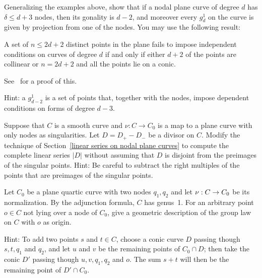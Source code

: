 \begin{exercise}
Generalizing the examples above, show that if a nodal plane curve of degree $d$ has $\delta\leq d+3$ nodes,
then its gonality is $d-2$, and moreover every $g^1_d$ on the curve is given by projection from one of the nodes.
You may use the following result:
\begin{proposition}\label{independent conditions}
 A set of $n \leq 2d+ 2$ distinct
points in the plane fails to impose independent conditions on curves of degree
$d$ if and only if either $d + 2$ of the points  are collinear or $n = 2d + 2$ and all the points lie
on a conic.
\end{proposition} 
See~\cite[p. 302]{MR1376653} for a proof of this.

Hint: a $g^1_{d-2}$ is a set of points that, together with the nodes, impose dependent conditions on forms of degree $d-3$.
\end{exercise}

\begin{exercise}\label{general case of divisors on nodal curves}
Suppose that $C$ is a smooth curve and $\nu: C \to C_0$ is a map to a plane curve with
only nodes as singularities. Let $D = D_{+}-D_{-}$ be a divisor on $C$. Modify the 
technique of Section~\ref{linear series on nodal plane curves} to compute the complete
linear series $|D|$ without assuming that $D$ is disjoint from the preimages of the singular
points. 
Hint: Be careful to subtract the right multiples of the points that are preimages of the singular
points.
\end{exercise}

\begin{exercise}
Let $C_0$ be a plane quartic curve with two nodes $q_1, q_2$
and 
let $\nu :\nobreak C \to C_0$ be its normalization. 
By the adjunction formula, $C$ has genus~1.
For an arbitrary point
$o \in C$ not
lying over a node of $C_0$,
 give a geometric description
of the group law on $C$ with $o$ as origin.

Hint: To add two points $s$ and $t \in C$, choose a conic curve $D$
passing though $s, t, q_1$ and $q_2$, and let $u$ and $v$ be the remaining
points of $C_0 \cap D$; then take the conic 
$D'$ passing though $u, v,
q_1, q_2$ and $o$. The sum $s+t$ will then be the remaining point of $D'
\cap C_0$.
\end{exercise}

